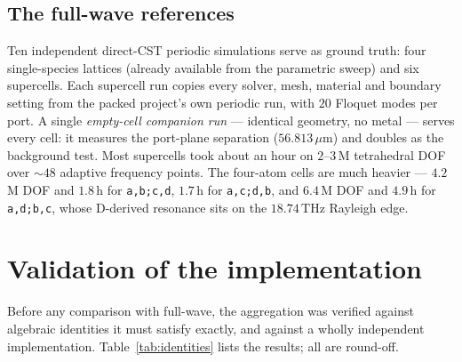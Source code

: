 \documentclass[11pt,a4paper]{article}
\newcommand{\um}{\ensuremath{\,\mu\mathrm{m}}}
\newcommand{\THz}{\ensuremath{\,\mathrm{THz}}}
\theoremstyle{plain}
\theoremstyle{definition}
\begin{document}
\subsection{The full-wave references}

Ten independent direct-CST periodic simulations serve as ground truth: four
single-species lattices (already available from the parametric sweep) and six
supercells. Each supercell run copies every solver, mesh, material and boundary
setting from the packed project's own periodic run, with $20$ Floquet modes per
port. A single \emph{empty-cell companion run} --- identical geometry, no metal
--- serves every cell: it measures the port-plane separation ($56.813\um$) and
doubles as the background test. Most supercells took about an hour on
$2$--$3$\,M tetrahedral DOF over $\sim\!48$ adaptive frequency points. The
four-atom cells are much heavier --- $4.2$\,M DOF and $1.8$\,h for
\texttt{a,b;c,d}, $1.7$\,h for \texttt{a,c;d,b}, and $6.4$\,M DOF and $4.9$\,h
for \texttt{a,d;b,c}, whose D-derived resonance sits on the $18.74\THz$ Rayleigh
edge.

\section{Validation of the implementation}
\label{sec:validation}

Before any comparison with full-wave, the aggregation was verified against
algebraic identities it must satisfy exactly, and against a wholly independent
implementation. Table~\ref{tab:identities} lists the results; all are round-off.
\end{document}
